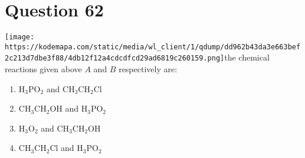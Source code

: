 \documentclass{article}
\begin{document}
\section*{Question 62}
\texttt{[image: https://kodemapa.com/static/media/wl\_client/1/qdump/dd962b43da3e663bef2c213d7dbe3f88/4db12f12a4cdcdfcd29ad6819c260159.png]}\newlineIn the chemical reactions given above \(A\) and \(B\) respectively are: 
\begin{enumerate}[label=(\alph*)]
\item \(\mathrm{H}_3 \mathrm{PO}_2\) and \(\mathrm{CH}_3 \mathrm{CH}_2 \mathrm{Cl}\)
\item \(\mathrm{CH}_3 \mathrm{CH}_2 \mathrm{OH}\) and \(\mathrm{H}_3 \mathrm{PO}_2\)
\item \(\mathrm{H}_3 \mathrm{O}_2\) and \(\mathrm{CH}_3 \mathrm{CH}_2 \mathrm{OH}\)
\item \(\mathrm{CH}_3 \mathrm{CH}_2 \mathrm{Cl}\) and \(\mathrm{H}_3 \mathrm{PO}_2\)
\end{enumerate}
\newpage
\end{document}
